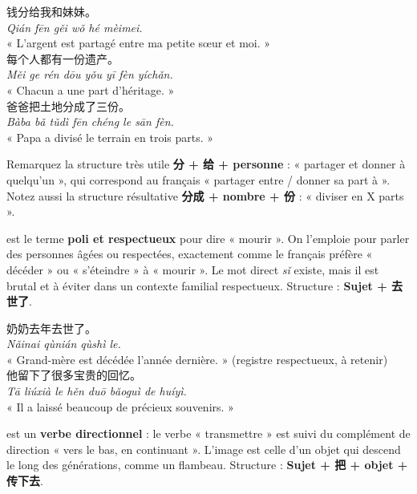 \documentclass[11pt]{article}
\newcommand{\zh}[1]{\ifmmode\text{#1}\else{#1}\fi}
\begin{document}
\begin{exemplebox}
钱分给我和妹妹。\\
\emph{Qián fēn gěi wǒ hé mèimei.}\\
« L'argent est partagé entre ma petite sœur et moi. »\\[4pt]
每个人都有一份遗产。\\
\emph{Měi ge rén dōu yǒu yī fèn yíchǎn.}\\
« Chacun a une part d'héritage. »\\[4pt]
爸爸把土地分成了三份。\\
\emph{Bàba bǎ tǔdì fēn chéng le sān fèn.}\\
« Papa a divisé le terrain en trois parts. »
\end{exemplebox}

Remarquez la structure très utile \textbf{分 + 给 + personne} : « partager et donner à quelqu'un », qui correspond au français « partager entre / donner sa part à ». Notez aussi la structure résultative \textbf{分成 + nombre + 份} : « diviser en X parts ».

\begin{definition}
\zh{去世} est le terme \textbf{poli et respectueux} pour dire « mourir ». On l'emploie pour parler des personnes âgées ou respectées, exactement comme le français préfère « décéder » ou « s'éteindre » à « mourir ». Le mot direct \zh{死} \emph{sǐ} existe, mais il est brutal et à éviter dans un contexte familial respectueux. Structure : \textbf{Sujet + 去世了}.
\end{definition}

\begin{exemplebox}
奶奶去年去世了。\\
\emph{Nǎinai qùnián qùshì le.}\\
« Grand-mère est décédée l'année dernière. » (registre respectueux, à retenir)\\[4pt]
他留下了很多宝贵的回忆。\\
\emph{Tā liúxià le hěn duō bǎoguì de huíyì.}\\
« Il a laissé beaucoup de précieux souvenirs. »
\end{exemplebox}

\begin{definition}
\zh{传下去} est un \textbf{verbe directionnel} : le verbe \zh{传} « transmettre » est suivi du complément de direction \zh{下去} « vers le bas, en continuant ». L'image est celle d'un objet qui descend le long des générations, comme un flambeau. Structure : \textbf{Sujet + 把 + objet + 传下去}.
\end{definition}
\end{document}
